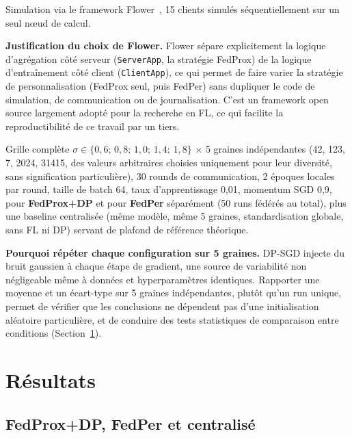 \documentclass{acmart}
\begin{document}
Simulation via le framework Flower~\cite{beutel2020flower}, 15 clients
simulés séquentiellement sur un seul nœud de calcul.

\textbf{Justification du choix de Flower.} Flower sépare explicitement la
logique d'agrégation côté serveur (\texttt{ServerApp}, la stratégie FedProx)
de la logique d'entraînement côté client (\texttt{ClientApp}), ce qui permet
de faire varier la stratégie de personnalisation (FedProx seul, puis FedPer)
sans dupliquer le code de simulation, de communication ou de journalisation.
C'est un framework open source largement adopté pour la recherche en FL, ce
qui facilite la reproductibilité de ce travail par un tiers.

Grille complète $\sigma \in \{0{,}6;\,0{,}8;\,1{,}0;\,1{,}4;\,1{,}8\}$
$\times$ 5 graines indépendantes (42, 123, 7, 2024, 31415, des valeurs
arbitraires choisies uniquement pour leur diversité, sans signification
particulière), 30 rounds de communication, 2 époques locales par round,
taille de batch 64, taux d'apprentissage 0,01, momentum SGD 0,9, pour
\textbf{FedProx+DP} et pour \textbf{FedPer} séparément (50 runs fédérés au
total), plus une baseline centralisée (même modèle, même 5 graines,
standardisation globale, sans FL ni DP) servant de plafond de référence
théorique.

\textbf{Pourquoi répéter chaque configuration sur 5 graines.} DP-SGD injecte
du bruit gaussien à chaque étape de gradient, une source de variabilité
non négligeable même à données et hyperparamètres identiques. Rapporter une
moyenne et un écart-type sur 5 graines indépendantes, plutôt qu'un run
unique, permet de vérifier que les conclusions ne dépendent pas d'une
initialisation aléatoire particulière, et de conduire des tests statistiques
de comparaison entre conditions (Section~\ref{sec:results}).

\section{Résultats}
\label{sec:results}

\subsection{FedProx+DP, FedPer et centralisé}
\end{document}
